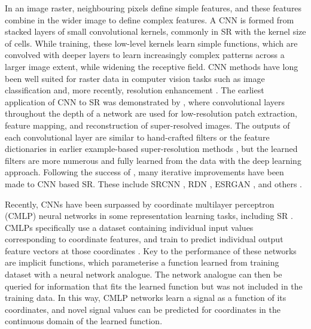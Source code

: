 In an image raster, neighbouring pixels define simple features, and these features combine in the wider image to define complex features.
A CNN is formed from stacked layers of small convolutional kernels, commonly in SR with the kernel size of  cells.
While training, these low-level kernels learn simple functions, which are convolved with deeper layers to learn increasingly complex patterns across a larger image extent, while widening the receptive field.
CNN methods have long been well suited for raster data in computer vision tasks such as image classification \parencite[e.g.][]{simonyanVeryDeepConvolutional2015} and, more recently, resolution enhancement \parencite[e.g.][]{zhangResidualDenseNetwork2018}.
The earliest application of CNN to SR was demonstrated by \textcite{dongLearningDeepConvolutional2014}, where convolutional layers throughout the depth of a network are used for low-resolution patch extraction, feature mapping, and reconstruction of super-resolved images.
The outputs of each convolutional layer are similar to hand-crafted filters or the feature dictionaries in earlier example-based super-resolution methods \parencite{freemanExamplebasedSuperresolution2002}, but the learned filters are more numerous and fully learned from the data with the deep learning approach.
Following the success of \parencite{dongLearningDeepConvolutional2014}, many iterative improvements have been made to CNN based SR\@.
These include SRCNN \parencite{dongImageSuperresolutionUsing2016}, RDN \parencite{zhangResidualDenseNetwork2018}, ESRGAN \parencite{wangESRGANEnhancedSuperresolution2018}, and others \parencite{ledigPhotorealisticSingleImage2017,limEnhancedDeepResidual2017}.

Recently, CNNs have been surpassed by coordinate multilayer perceptron (CMLP) neural networks in some representation learning tasks, including SR \parencite{chenLearningContinuousImage2021}.
CMLPs specifically use a dataset containing individual input values corresponding to coordinate features, and train to predict individual output feature vectors at those coordinates \parencite[e.g.][]{mildenhallNERFRepresentingScenes2020}.
Key to the performance of these networks are implicit functions, which parameterise a function learned from training dataset with a neural network analogue.
The network analogue can then be queried for information that fits the learned function but was not included in the training data.
In this way, CMLP networks learn a signal as a function of its coordinates, and novel signal values can be predicted for coordinates in the continuous domain of the learned function.

